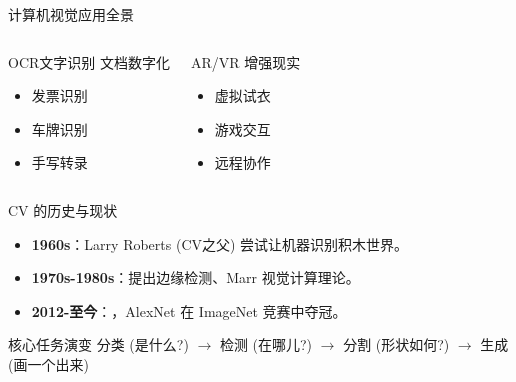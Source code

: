 \begin{frame}[fragile]{计算机视觉应用全景}
\begin{columns}
        \begin{block}{OCR文字识别}
            文档数字化
            \begin{itemize}
                \item 发票识别
                \item 车牌识别
                \item 手写转录
            \end{itemize}
        \end{block}

        \begin{block}{AR/VR}
            增强现实
            \begin{itemize}
                \item 虚拟试衣
                \item 游戏交互
                \item 远程协作
            \end{itemize}
        \end{block}
    \end{columns}

    \vspace{0.3cm}
    \begin{center}
    \end{center}
\end{frame}

\begin{frame}[fragile]{CV 的历史与现状}
    \begin{itemize}
        \item \textbf{1960s}：Larry Roberts (CV之父) 尝试让机器识别积木世界。
        \item \textbf{1970s-1980s}：提出边缘检测、Marr 视觉计算理论。
        \item \textbf{2012-至今}：，AlexNet 在 ImageNet 竞赛中夺冠。
    \end{itemize}
    \begin{block}{核心任务演变}
        分类 (是什么?) $\to$ 检测 (在哪儿?) $\to$ 分割 (形状如何?) $\to$ 生成 (画一个出来)
    \end{block}
\end{frame}

